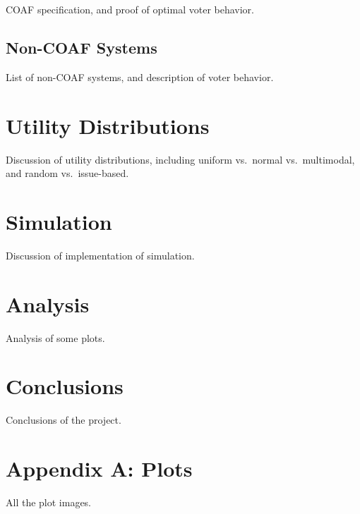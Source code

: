 \documentclass[11pt]{article}
\begin{document}
    COAF specification, and proof of optimal voter behavior.

    \subsection{Non-COAF Systems}\label{subsec:non-coaf-systems}

    List of non-COAF systems, and description of voter behavior.


    \section{Utility Distributions}\label{sec:utility-distributions}

    Discussion of utility distributions, including uniform vs.\ normal
    vs.\ multimodal, and random vs.\ issue-based.


    \section{Simulation}\label{sec:simulation}

    Discussion of implementation of simulation.


    \section{Analysis}\label{sec:analysis}

    Analysis of some plots.


    \section{Conclusions}\label{sec:conclusions}

    Conclusions of the project.


    \section{Appendix A: Plots}\label{sec:appendix-a:-plots}

    All the plot images.


    
    {}
\end{document}
